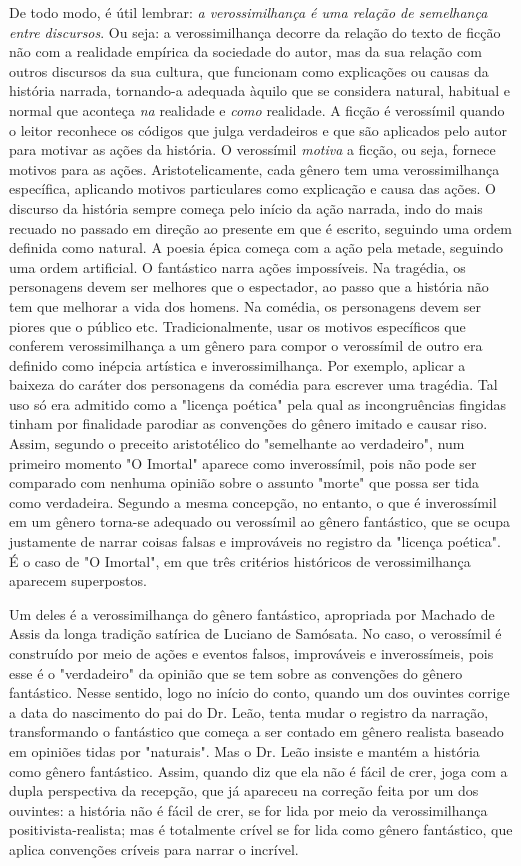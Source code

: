 De todo modo, é útil lembrar: \emph{a verossimilhança é uma relação de
semelhança entre discursos}. Ou seja: a verossimilhança decorre da
relação do texto de ficção não com a realidade empírica da sociedade do
autor, mas da sua relação com outros discursos da sua cultura, que
funcionam como explicações ou causas da história narrada, tornando-a
adequada àquilo que se considera natural, habitual e normal que aconteça
\emph{na} realidade e \emph{como} realidade. A ficção é verossímil
quando o leitor reconhece os códigos que julga verdadeiros e que são
aplicados pelo autor para motivar as ações da história. O verossímil
\emph{motiva} a ficção, ou seja, fornece motivos para as ações.
Aristotelicamente, cada gênero tem uma verossimilhança específica,
aplicando motivos particulares como explicação e causa das ações. O
discurso da história sempre começa pelo início da ação narrada, indo do
mais recuado no passado em direção ao presente em que é escrito,
seguindo uma ordem definida como natural. A poesia épica começa com a
ação pela metade, seguindo uma ordem artificial. O fantástico narra
ações impossíveis. Na tragédia, os personagens devem ser melhores que o
espectador, ao passo que a história não tem que melhorar a vida dos
homens. Na comédia, os personagens devem ser piores que o público etc.
Tradicionalmente, usar os motivos específicos que conferem
verossimilhança a um gênero para compor o verossímil de outro era
definido como inépcia artística e inverossimilhança. Por exemplo,
aplicar a baixeza do caráter dos personagens da comédia para escrever
uma tragédia. Tal uso só era admitido como a "licença poética" pela qual
as incongruências fingidas tinham por finalidade parodiar as convenções
do gênero imitado e causar riso. Assim, segundo o preceito aristotélico
do "semelhante ao verdadeiro", num primeiro momento "O Imortal" aparece
como inverossímil, pois não pode ser comparado com nenhuma opinião sobre
o assunto "morte" que possa ser tida como verdadeira. Segundo a mesma
concepção, no entanto, o que é inverossímil em um gênero torna-se
adequado ou verossímil ao gênero fantástico, que se ocupa justamente de
narrar coisas falsas e improváveis no registro da "licença poética". É o
caso de "O Imortal", em que três critérios históricos de verossimilhança
aparecem superpostos.

Um deles é a verossimilhança do gênero fantástico, apropriada por
Machado de Assis da longa tradição satírica de Luciano de Samósata. No
caso, o verossímil é construído por meio de ações e eventos falsos,
improváveis e inverossímeis, pois esse é o "verdadeiro" da opinião que
se tem sobre as convenções do gênero fantástico. Nesse sentido, logo no
início do conto, quando um dos ouvintes corrige a data do nascimento do
pai do Dr. Leão, tenta mudar o registro da narração, transformando o
fantástico que começa a ser contado em gênero realista baseado em
opiniões tidas por "naturais". Mas o Dr. Leão insiste e mantém a
história como gênero fantástico. Assim, quando diz que ela não é fácil
de crer, joga com a dupla perspectiva da recepção, que já apareceu na
correção feita por um dos ouvintes: a história não é fácil de crer, se
for lida por meio da verossimilhança positivista-realista; mas é
totalmente crível se for lida como gênero fantástico, que aplica
convenções críveis para narrar o incrível.

